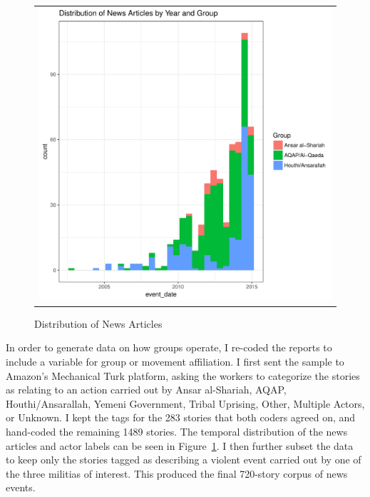 \begin{figure}
\begin{center}
\begin{tabular}{c}
 \includegraphics[width=5.00in]{./Pictures/storyHistogram.pdf}
\end{tabular}
\caption{Distribution of News Articles}
\label{fig:news-hist}
\end{center}
 \end{figure}

In order to generate data on how groups operate, I re-coded the reports to include a
variable for group or movement affiliation. I first sent the sample to
Amazon's Mechanical Turk platform, asking the workers to categorize
the stories as relating to an action carried out by Ansar al-Shariah,
AQAP, Houthi/Ansarallah, Yemeni Government, Tribal Uprising, Other,
Multiple Actors, or Unknown.  I kept the tags for the 283 stories that
both coders agreed on, and hand-coded the remaining 1489 stories. The temporal distribution of
the news articles and actor labels can be seen in Figure~\ref{fig:news-hist}. I
then further subset the data to keep only the stories tagged as
describing a violent event carried out by one of the three militias of
interest. This produced the final 720-story corpus of news events.

